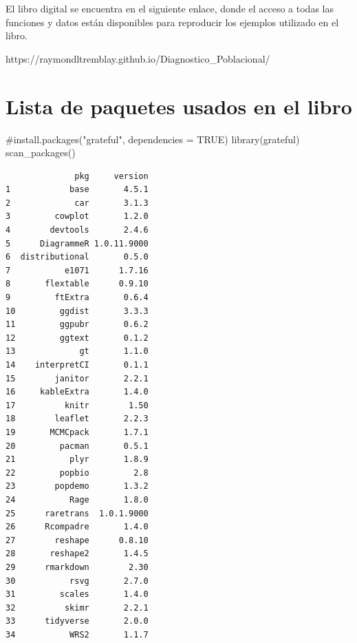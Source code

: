 \documentclass[
  12pt,
  letterpaper,
]{book}
\newenvironment{Shaded}{\begin{snugshade}}{\end{snugshade}}
\newcommand{\CommentTok}[1]{\textcolor[rgb]{0.37,0.37,0.37}{#1}}
\newcommand{\FunctionTok}[1]{\textcolor[rgb]{0.28,0.35,0.67}{#1}}
\newcommand{\NormalTok}[1]{\textcolor[rgb]{0.00,0.23,0.31}{#1}}
\begin{document}
El libro digital se encuentra en el siguiente enlace, donde el acceso a
todas las funciones y datos están disponibles para reproducir los
ejemplos utilizado en el libro.

https://raymondltremblay.github.io/Diagnostico\_Poblacional/

\section{Lista de paquetes usados en el
libro}\label{lista-de-paquetes-usados-en-el-libro}

\begin{Shaded}
\begin{Highlighting}[]
\CommentTok{\#install.packages("grateful", dependencies = TRUE)}
\FunctionTok{library}\NormalTok{(grateful)}
\FunctionTok{scan\_packages}\NormalTok{()}
\end{Highlighting}
\end{Shaded}

\begin{verbatim}
              pkg     version
1            base       4.5.1
2             car       3.1.3
3         cowplot       1.2.0
4        devtools       2.4.6
5      DiagrammeR 1.0.11.9000
6  distributional       0.5.0
7           e1071      1.7.16
8       flextable      0.9.10
9         ftExtra       0.6.4
10         ggdist       3.3.3
11         ggpubr       0.6.2
12         ggtext       0.1.2
13             gt       1.1.0
14    interpretCI       0.1.1
15        janitor       2.2.1
16     kableExtra       1.4.0
17          knitr        1.50
18        leaflet       2.2.3
19       MCMCpack       1.7.1
20         pacman       0.5.1
21           plyr       1.8.9
22         popbio         2.8
23        popdemo       1.3.2
24           Rage       1.8.0
25      raretrans  1.0.1.9000
26      Rcompadre       1.4.0
27        reshape      0.8.10
28       reshape2       1.4.5
29      rmarkdown        2.30
30           rsvg       2.7.0
31         scales       1.4.0
32          skimr       2.2.1
33      tidyverse       2.0.0
34           WRS2       1.1.7
\end{verbatim}
\end{document}
